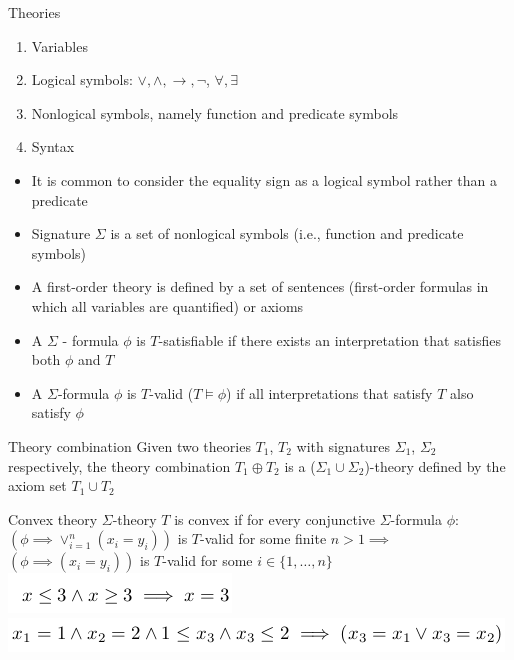 \documentclass{beamer}
\begin{document}
\begin{frame}{Theories}
\begin{enumerate}
\item Variables
\item Logical symbols: $\vee, \wedge, \rightarrow, \lnot$, $\forall, \exists$
\item Nonlogical symbols, namely function and predicate symbols
\item Syntax
\end{enumerate}
\begin{itemize}
\item It is common to consider the equality sign as a logical symbol rather than a predicate
\item Signature $\Sigma$ is a set of nonlogical symbols (i.e., function and predicate symbols)
\item A first-order theory is defined by a set of sentences (first-order formulas in which all variables are quantified) or axioms
\item A $\Sigma$ - formula $\phi$ is $T$-satisfiable if there exists an interpretation that satisfies both $\phi$ and $T$
\item A $\Sigma$-formula $\phi$ is $T$-valid ($T\models\phi$) if all interpretations that satisfy $T$ also satisfy $\phi$
\end{itemize}
\end{frame}

\begin{frame}{Theory combination}
Given two theories $T_1$, $T_2$ with signatures $\Sigma_1$, $\Sigma_2$ respectively, the theory combination $T_1 \oplus T_2$
is a ($\Sigma_1 \cup \Sigma_2$)-theory defined by the axiom set $T_1 \cup T_2$
\end{frame}

\begin{frame}{Convex theory}
$\Sigma$-theory $T$ is convex if for every conjunctive $\Sigma$-formula $\phi$:\newline
$(\phi \implies \vee_{i=1}^{n}(x_i=y_i))$ is $T$-valid for some finite $n > 1 \implies$\newline
$(\phi \implies (x_i=y_i))$ is $T$-valid for some $i \in \{1, \dots, n\}$
\includegraphics[scale=0.5]{convex.png}\newline
\includegraphics[scale=0.5]{not_convex.png}\newline
\end{frame}
\end{document}
